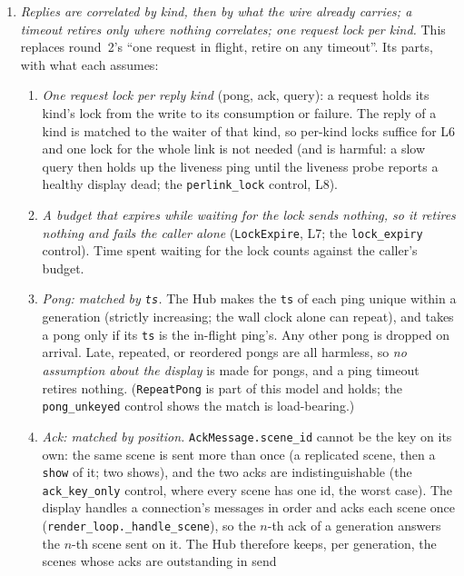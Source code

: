 \documentclass[a4paper,10pt,fleqn]{article}
\begin{document}
\begin{enumerate}
  \item \emph{Replies are correlated by kind, then by what the wire already
    carries; a timeout retires only where nothing correlates; one request
    lock per kind.}  This replaces round~2's ``one request in flight, retire on
    any timeout''.  Its parts, with what each assumes:
    \begin{enumerate}
      \item[(a)] \emph{One request lock per reply kind} (pong, ack, query): a
        request holds its kind's lock from the write to its consumption or
        failure.  The reply of a kind is matched to the waiter of that kind, so
        per-kind locks suffice for L6 and one lock for the whole link is not
        needed (and is harmful: a slow query then holds up the liveness ping
        until the liveness probe reports a healthy display dead; the
        \texttt{perlink\_lock} control, L8).
      \item[(b)] \emph{A budget that expires while waiting for the lock sends
        nothing, so it retires nothing and fails the caller alone}
        (\texttt{LockExpire}, L7; the \texttt{lock\_expiry} control).  Time spent
        waiting for the lock counts against the caller's budget.
      \item[(c)] \emph{Pong: matched by \texttt{ts}.}  The Hub makes the
        \texttt{ts} of each ping unique within a generation (strictly
        increasing; the wall clock alone can repeat), and takes a pong
        only if its \texttt{ts} is the in-flight ping's.  Any other pong is
        dropped on arrival.  Late, repeated, or reordered pongs are all
        harmless, so \emph{no assumption about the display} is made for
        pongs, and a ping timeout retires nothing.  (\texttt{RepeatPong} is part
        of this model and holds; the \texttt{pong\_unkeyed} control shows the
        match is load-bearing.)
      \item[(d)] \emph{Ack: matched by position.}  \texttt{AckMessage.scene\_id}
        cannot be the key on its own: the same scene is sent more than once (a
        replicated scene, then a \texttt{show} of it; two shows), and the two
        acks are indistinguishable (the \texttt{ack\_key\_only} control, where
        every scene has one id, the worst case).  The display handles a
        connection's messages in order and acks each scene once
        (\texttt{render\_loop.\_handle\_scene}), so the $n$-th ack of a
        generation answers the $n$-th scene sent on it.  The Hub therefore
        keeps, per generation, the scenes whose acks are outstanding in send

\end{enumerate}
\end{enumerate}
\end{document}
